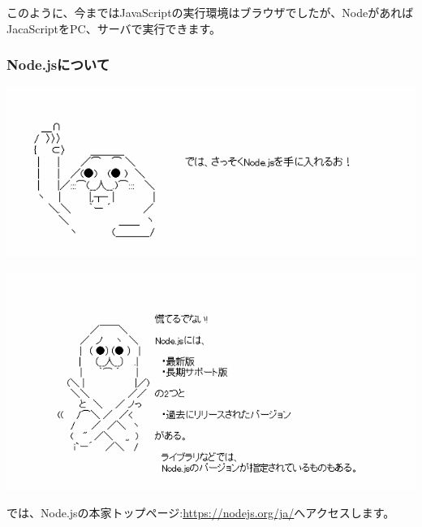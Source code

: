このように、今まではJavaScriptの実行環境はブラウザでしたが、NodeがあればJacaScriptをPC、サーバで実行できます。


\clearpage


\subsubsection*{Node.jsについて}
\keeplastskip{
  \label{sec:1-1-1-2}
  \par\nobreak
}
\begin{reviewimage}%
\includegraphics[width=1.0\maxwidth]{./images/01-createDevEnv/y01_getNodejs.png}%
\label{image:01-createDevEnv:y01_getNodejs}
\end{reviewimage}
\begin{reviewimage}%
\includegraphics[width=1.0\maxwidth]{./images/01-createDevEnv/yr01_aboutNodejs.png}%
\label{image:01-createDevEnv:yr01_aboutNodejs}
\end{reviewimage}

では、Node.jsの本家トップページ:\url{https://nodejs.org/ja/}へアクセスします。

